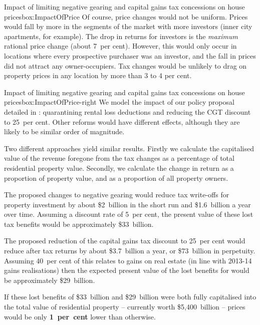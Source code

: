 {\begin{lultrabox}{Impact of limiting negative gearing and capital gains tax \newline concessions on house prices}{box:ImpactOfPrice}
Of course, price changes would not be uniform. Prices would fall by more in the segments of the market with more investors (inner city apartments, for example). The drop in returns for investors is the \emph{maximum} rational price change (about 7~per cent). However, this would only occur in locations where every prospective purchaser was an investor, and the fall in prices did not attract any owner-occupiers. Tax changes would be unlikely to drag on property prices in any location by more than 3 to 4 per cent.
\end{lultrabox}
\begin{rultrabox}{Impact of limiting negative gearing and capital gains  tax \newline concessions on house prices}{box:ImpactOfPrice-right}
We model the impact of our policy proposal detailed in : quarantining rental loss deductions and reducing the CGT discount to 25~per cent. Other reforms would have different effects, although they are likely to be similar order of magnitude.

Two different approaches yield similar results. Firstly we calculate the capitalised value of the revenue foregone from the tax changes as a percentage of total residential property value. Secondly, we calculate the change in return as a proportion of property value, and as a proportion of all property owners.

The proposed changes to negative gearing would reduce tax write-offs for property investment by about \$2~billion in the short run and \$1.6~billion a year over time. Assuming a discount rate of 
5~per cent, the present value of these lost tax benefits would be approximately \$33~billion.

The proposed reduction of the capital gains tax discount to 25~per cent would reduce after tax returns by about \$3.7~billion a year, or \$73~billion in perpetuity. Assuming 40~per cent of this relates to gains on real estate (in line with 2013-14 gains realisations) then the expected present value of the lost benefits for would be approximately \$29~billion.

If these lost benefits of \$33~billion and \$29~billion were both fully capitalised into the total value of residential property -- currently worth \$5,400~billion -- prices would be only \textbf{1~per~cent} lower than otherwise.


\end{rultrabox}}
